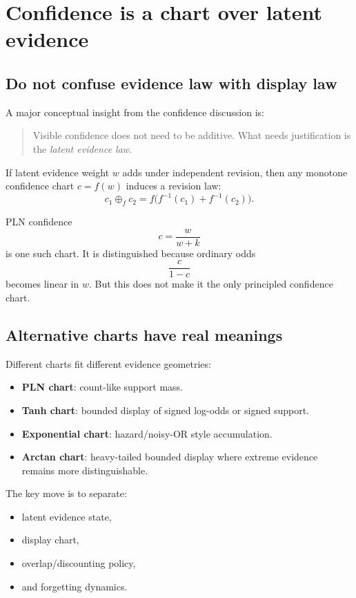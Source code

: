 \documentclass[11pt]{article}
\begin{document}
\section{Confidence is a chart over latent evidence}

\subsection{Do not confuse evidence law with display law}

A major conceptual insight from the confidence discussion is:

\begin{quote}
Visible confidence does not need to be additive. What needs justification is the \emph{latent evidence law}.
\end{quote}

If latent evidence weight \(w\) adds under independent revision, then any monotone confidence chart \(c=f(w)\) induces a revision law:
\[
c_1 \oplus_f c_2 = f\bigl(f^{-1}(c_1)+f^{-1}(c_2)\bigr).
\]

PLN confidence
\[
c=\frac{w}{w+k}
\]
is one such chart. It is distinguished because ordinary odds
\[
\frac{c}{1-c}
\]
becomes linear in \(w\). But this does not make it the only principled confidence chart.

\subsection{Alternative charts have real meanings}

Different charts fit different evidence geometries:
\begin{itemize}
    \item \textbf{PLN chart}: count-like support mass.
    \item \textbf{Tanh chart}: bounded display of signed log-odds or signed support.
    \item \textbf{Exponential chart}: hazard/noisy-OR style accumulation.
    \item \textbf{Arctan chart}: heavy-tailed bounded display where extreme evidence remains more distinguishable.
\end{itemize}

The key move is to separate:
\begin{itemize}
    \item latent evidence state,
    \item display chart,
    \item overlap/discounting policy,
    \item and forgetting dynamics.
\end{itemize}
\end{document}

